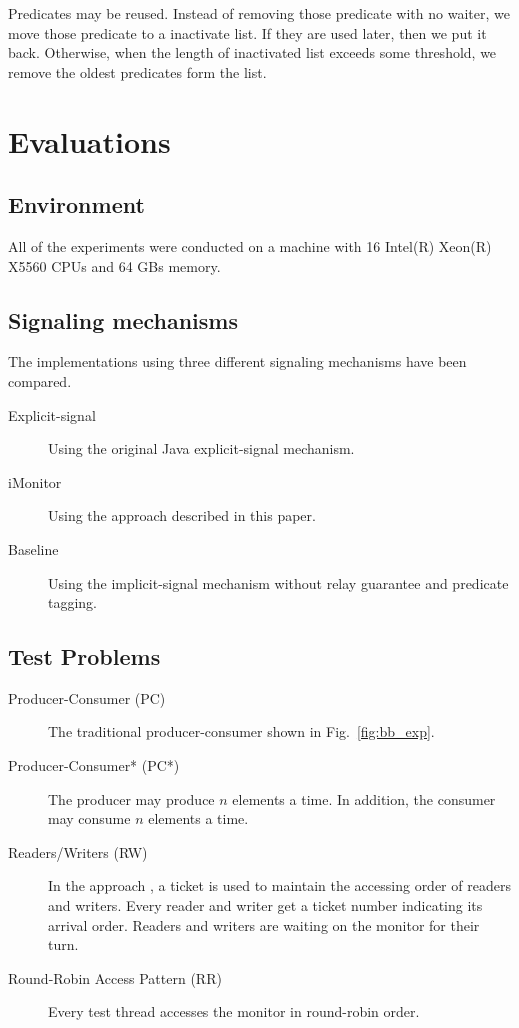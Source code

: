 \documentclass[preprint]{sigplanconf}
\begin{document}
Predicates may be reused. Instead  of removing those predicate with no waiter, 
we move those predicate to a inactivate list. If they are used later, then we 
put it back. Otherwise, when the length of inactivated list exceeds some 
threshold, we remove the oldest predicates form the list.


\section{Evaluations} \label{sec:eval}
\subsection{Environment}
All of the experiments were conducted on a machine with 16 
Intel(R) Xeon(R) X5560 CPUs and 64 GBs memory. 


\subsection{Signaling mechanisms}
The implementations using three different signaling mechanisms have been 
compared. 
\begin{description}
    \item[Explicit-signal] Using the original Java explicit-signal mechanism. 
    \item[iMonitor] Using the approach described in this paper. 
    \item[Baseline] Using the implicit-signal mechanism without relay guarantee
        and predicate tagging. 
\end{description}

\subsection{Test Problems}
\begin{description}
    \item[Producer-Consumer (PC)] The traditional producer-consumer shown in 
        Fig.~\ref{fig:bb_exp}.
    \item[Producer-Consumer* (PC*)] The producer may produce $n$ elements a 
        time. In addition, the consumer may consume $n$ elements a time.
    \item[Readers/Writers (RW)] In the approach \cite{bh05}, a ticket is used
        to maintain the accessing order of readers and writers. Every reader
        and writer get a ticket number indicating its arrival order. Readers
        and writers are waiting on the monitor for their turn. 
    \item[Round-Robin Access Pattern (RR)] Every test thread accesses the
        monitor in round-robin order. 
\end{description}
\end{document}
